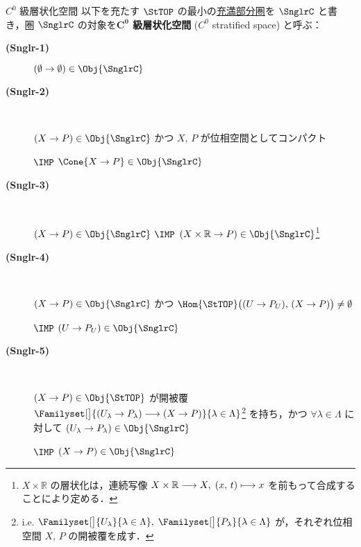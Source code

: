 \documentclass[TQFT_main]{subfiles}
\begin{document}
\begin{mydef}[label=def:Snglr-C0]{$C^0$ 級層状化空間}
    以下を充たす $\StTOP$ の最小の\hyperref[def:faithful]{充満部分圏}を $\SnglrC$ と書き，圏 $\SnglrC$ の対象を\textbf{$\bm{C^0}$ 級層状化空間} ($C^0$ stratified space) と呼ぶ：
    \begin{description}
        \item[\textbf{(Snglr-1)}] $(\emptyset \to \emptyset) \in \Obj{\SnglrC}$
        \item[\textbf{(Snglr-2)}]　
        
        $(X \to P) \in \Obj{\SnglrC}$ かつ $X,\, P$ が位相空間としてコンパクト 
        
        $\IMP$ $\Cone{X \to P} \in \Obj{\SnglrC}$
        
        \item[\textbf{(Snglr-3)}]　
        
        $(X \to P) \in \Obj{\SnglrC}$ $\IMP$ $(X \times \mathbb{R} \to P) \in \Obj{\SnglrC}$\footnote{$X \times \mathbb{R}$ の層状化は，連続写像 $X \times \mathbb{R} \longrightarrow X,\; (x,\, t) \longmapsto x$ を前もって合成することにより定める．}
        
        \item[\textbf{(Snglr-4)}]　
        
        $(X \to P) \in \Obj{\SnglrC}$ かつ $\Hom{\StTOP} \bigl( (U \to P_U),\, (X \to P) \bigr) \neq \emptyset$ 
        
        $\IMP$ $(U \to P_U) \in \Obj{\SnglrC}$
        
        \item[\textbf{(Snglr-5)}]　 
        
        $(X \to P) \in \Obj{\StTOP}$ が開被覆 $\Familyset[\big]{(U_\lambda \to P_\lambda) \lto (X \to P)}{\lambda \in \Lambda}$\footnote{i.e. $\Familyset[\big]{U_\lambda}{\lambda \in \Lambda},\; \Familyset[\big]{P_\lambda}{\lambda \in \Lambda}$ が，それぞれ位相空間 $X,\, P$ の開被覆を成す．} を持ち，かつ $\forall \lambda \in \Lambda$ に対して $(U_\lambda \to P_\lambda) \in \Obj{\SnglrC}$ 
        
        $\IMP$ $(X \to P) \in \Obj{\SnglrC}$
    \end{description}
\end{mydef}
\end{document}
